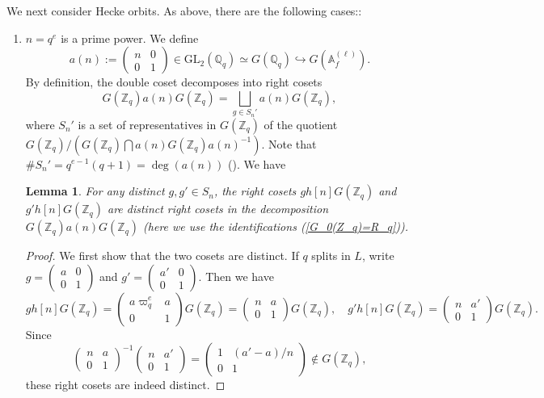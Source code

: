 \documentclass[11pt,oneside,reqno]{amsart}
\newcommand{\GL}{\mathrm{GL}}
\newcommand{\A}{\mathbb{A}}
\newcommand{\Q}{\mathbb{Q}}
\newcommand{\Z}{\mathbb{Z}}
\theoremstyle{plain}
\newtheorem{lemma}[theorem]{Lemma}
\begin{document}
	
	We next consider Hecke orbits. As above, there are the following cases::
	\begin{enumerate}
		\item 
		$n=q^e$ is a prime power. We define
		\[
		a(n)
		:=
		\begin{pmatrix}
			n & 0 \\ 0 & 1
		\end{pmatrix}
		\in
		\GL_2(\Q_q)
		\simeq
		G(\Q_q)
		\hookrightarrow
		G(\A_f^{(\ell)}).
		\]
		By definition, the double coset decomposes into right cosets
		\[
		G(\Z_q)a(n)G(\Z_q)
		=
		\bigsqcup_{g\in S_n'}a(n)G(\Z_q),
		\]
		where $S_n'$ is a set of representatives in $G(\Z_q)$ of the quotient $G(\Z_q)/(G(\Z_q)\bigcap a(n)G(\Z_q)a(n)^{-1})$. Note that $\#S_n'=q^{e-1}(q+1)=\deg(a(n))$ (\cite[Theorem 3.24]{Shimura1971}). We have
		\begin{lemma}\label{Galois orbit contained in Hecke orbit}
			For any distinct $g,g'\in S_n$, the right cosets
			$gh[n]G(\Z_q)$ and $g'h[n]G(\Z_q)$ are distinct right cosets in the decomposition $G(\Z_q)a(n)G(\Z_q)$ (here we use the identifications (\ref{G_0(Z_q)=R_q})).
		\end{lemma}
		\begin{proof}
			We first show that the two cosets are distinct.
			If $q$ splits in $L$, write $g=\begin{pmatrix}
				a & 0 \\ 0 & 1
			\end{pmatrix}$ and $g'=\begin{pmatrix}
				a' & 0 \\ 0 & 1
			\end{pmatrix}$. Then we have
			\[
			gh[n]G(\Z_q)
			=
			\begin{pmatrix}
				a\varpi_q^e & a \\ 0 & 1
			\end{pmatrix}
			G(\Z_q)
			=
			\begin{pmatrix}
				n & a \\ 0 & 1
			\end{pmatrix}
			G(\Z_q),
			\quad
			g'h[n]G(\Z_q)
			=
			\begin{pmatrix}
				n & a' \\ 0 & 1
			\end{pmatrix}
			G(\Z_q).
			\]
			Since 
			\[
			\begin{pmatrix}
				n & a \\ 0 & 1
			\end{pmatrix}^{-1}
			\begin{pmatrix}
				n & a' \\ 0 & 1
			\end{pmatrix}
			=
			\begin{pmatrix}
				1 & (a'-a)/n \\ 0 & 1
			\end{pmatrix}\notin G(\Z_q),
			\]
			these right cosets are indeed distinct.
			

\end{proof}
\end{enumerate}
\end{document}
